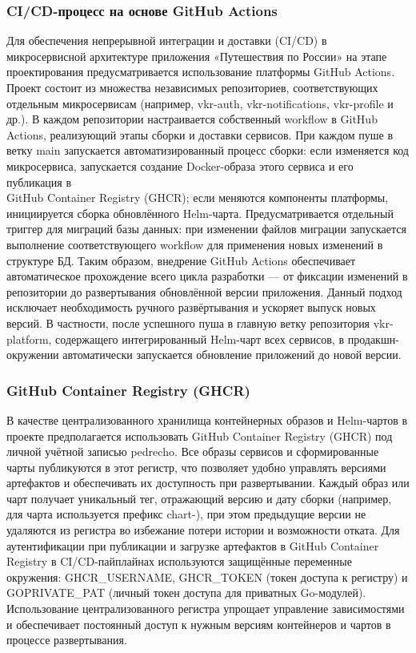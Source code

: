 \subsubsection*{CI/CD-процесс на основе GitHub Actions}
Для обеспечения непрерывной интеграции и доставки (CI/CD) в микросервисной архитектуре приложения «Путешествия по России» на этапе проектирования предусматривается использование платформы GitHub Actions. Проект состоит из множества независимых репозиториев, соответствующих отдельным микросервисам (например, vkr-auth, vkr-notifications, vkr-profile и др.). В каждом репозитории настраивается собственный workflow в GitHub Actions, реализующий этапы сборки и доставки сервисов. При каждом пуше в ветку main запускается автоматизированный процесс сборки: если изменяется код микросервиса, запускается создание Docker-образа этого сервиса и его публикация в \\ GitHub Container Registry (GHCR); если меняются компоненты платформы, инициируется сборка обновлённого Helm-чарта. Предусматривается отдельный триггер для миграций базы данных: при изменении файлов миграции запускается выполнение соответствующего workflow для применения новых изменений в структуре БД.
Таким образом, внедрение GitHub Actions обеспечивает автоматическое прохождение всего цикла разработки — от фиксации изменений в репозитории до развертывания обновлённой версии приложения. Данный подход исключает необходимость ручного развёртывания и ускоряет выпуск новых версий. В частности, после успешного пуша в главную ветку репозитория vkr-platform, содержащего интегрированный Helm-чарт всех сервисов, в продакшн-окружении автоматически запускается обновление приложений до новой версии.

\subsubsection*{GitHub Container Registry (GHCR)}
В качестве централизованного хранилища контейнерных образов и Helm-чартов в проекте предполагается использовать GitHub Container Registry (GHCR) под личной учётной записью pedrecho. Все образы сервисов и сформированные чарты публикуются в этот регистр, что позволяет удобно управлять версиями артефактов и обеспечивать их доступность при развертывании.
Каждый образ или чарт получает уникальный тег, отражающий версию и дату сборки (например, для чарта используется префикс chart-), при этом предыдущие версии не удаляются из регистра во избежание потери истории и возможности отката. Для аутентификации при публикации и загрузке артефактов в GitHub Container Registry в CI/CD-пайплайнах используются защищённые переменные окружения: GHCR\_USERNAME, GHCR\_TOKEN (токен доступа к регистру) и GOPRIVATE\_PAT (личный токен доступа для приватных Go-модулей). Использование централизованного регистра упрощает управление зависимостями и обеспечивает постоянный доступ к нужным версиям контейнеров и чартов в процессе развертывания.

